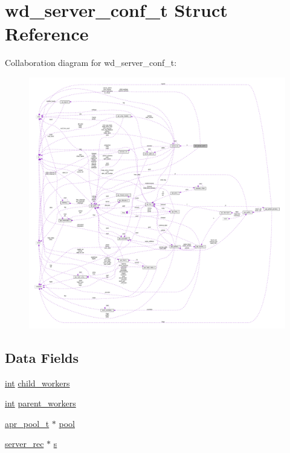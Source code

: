 \hypertarget{structwd__server__conf__t}{}\section{wd\+\_\+server\+\_\+conf\+\_\+t Struct Reference}
\label{structwd__server__conf__t}


Collaboration diagram for wd\+\_\+server\+\_\+conf\+\_\+t\+:
\nopagebreak
\begin{figure}[H]
\begin{center}
\leavevmode
\includegraphics[width=350pt]{structwd__server__conf__t__coll__graph}
\end{center}
\end{figure}
\subsection*{Data Fields}
\begin{DoxyCompactItemize}
\item 
\hyperlink{pcre_8txt_a42dfa4ff673c82d8efe7144098fbc198}{int} \hyperlink{structwd__server__conf__t_aaa9969ae538d8cb856e9b37c75f72844}{child\+\_\+workers}
\item 
\hyperlink{pcre_8txt_a42dfa4ff673c82d8efe7144098fbc198}{int} \hyperlink{structwd__server__conf__t_aa291bfde5561fc6412f9527368aea55d}{parent\+\_\+workers}
\item 
\hyperlink{structapr__pool__t}{apr\+\_\+pool\+\_\+t} $\ast$ \hyperlink{structwd__server__conf__t_ac4d0e0358227bd9b422198ffa1b849f7}{pool}
\item 
\hyperlink{structserver__rec}{server\+\_\+rec} $\ast$ \hyperlink{structwd__server__conf__t_aac947e3dc18bdc92d857644ac9e4517d}{s}
\end{DoxyCompactItemize}


